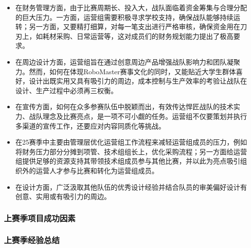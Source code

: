 
            \begin{itemize}
                \item 在财务管理方面，由于比赛周期长、投入大，战队面临着资金筹集与合理分配的巨大压力。一方面，运营组需要积极寻求学校支持，确保战队能够持续运转；另一方面，又要精打细算，对每一笔支出进行严格审核，确保资金用在刀刃上，如耗材采购、日常运营等，这对成员们的财务规划能力提出了极高要求。
                \item 在周边设计方面，运营组旨在通过创意周边产品增强战队影响力和团队凝聚力。然而，如何在体现RoboMaster赛事文化的同时，又能贴近大学生群体喜好，设计出既实用又具有吸引力的周边，成本控制与生产效率的考验让战队在设计、生产过程中必须再三权衡。
                \item 在宣传方面，如何在众多参赛队伍中脱颖而出，有效传达悍匠战队的技术实力、战队理念及比赛亮点，是一项不可小觑的任务。运营组不仅要策划并执行多渠道的宣传工作，还要应对内容同质化等挑战。
                \item 在25赛季中主要由管理层优化运营组工作流程来减轻运营组成员的压力，例如将财务压力部分分摊到项管、技术组组长上，优化采购流程；另一方面给运营组提供足够的资源支持其带领技术组成员参与其他比赛，并以此为亮点吸引组织外的运营人才参与比赛和转化为运营组成员。
                \item 在设计方面，广泛汲取其他队伍的优秀设计经验并结合队员的审美偏好设计有创意、实用或有吸引力的周边。
            \end{itemize}

    \subsubsection{上赛季项目成功因素}

    \subsubsection{上赛季经验总结}